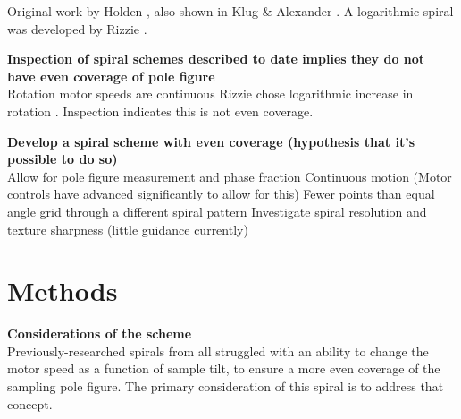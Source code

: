 \documentclass{article}
\begin{document}
Original work by Holden \citep{holden_spiralscanning_1953}, also shown in Klug \& Alexander \citep{klug_x-ray_1974}.  A logarithmic spiral was developed by Rizzie \citep{rizzie_elaboration_2008}.


\textbf{Inspection of spiral schemes described to date implies they do not have even coverage of pole figure}\\
Rotation motor speeds are continuous
Rizzie chose logarithmic increase in rotation \cite{rizzie_elaboration_2008}. Inspection indicates this is not even coverage.

\textbf{Develop a spiral scheme with even coverage (hypothesis that it's possible to do so)}\\
Allow for pole figure measurement and phase fraction
Continuous motion (Motor controls have advanced significantly to allow for this)
Fewer points than equal angle grid through a different spiral pattern
Investigate spiral resolution and texture sharpness (little guidance currently)




\section{Methods}

\textbf{Considerations of the scheme}\\

Previously-researched spirals from \cite{rizzie_elaboration_2008} all struggled with an ability to change the motor speed as a function of sample tilt, to ensure a more even coverage of the sampling pole figure. The primary consideration of this spiral is to address that concept.
    
\end{document}

